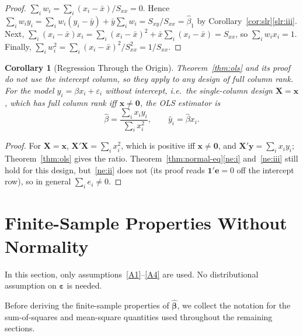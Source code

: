 \documentclass[14pt]{extarticle}
\theoremstyle{plain}
\newtheorem{corollary}[theorem]{Corollary}
\theoremstyle{definition}
\theoremstyle{remark}
\newcommand{\bX}{\mathbf{X}}
\newcommand{\by}{\mathbf{y}}
\newcommand{\bx}{\mathbf{x}}
\def\bb{\boldsymbol{\beta}}
\newcommand{\be}{\boldsymbol{\varepsilon}}
\newcommand{\bone}{\mathbf{1}}
\newcommand{\bzero}{\mathbf{0}}
\begin{document}
\begin{proof}
$\sum_i w_i = \sum_i (x_i - \bar x)/S_{xx} = 0$. Hence $\sum_i w_iy_i = \sum_i w_i(y_i - \bar y) + \bar y\sum_i w_i = S_{xy}/S_{xx} = \hat\beta_1$ by Corollary~\ref{cor:slr}\ref{slr:iii}. Next, $\sum_i (x_i - \bar x)x_i = \sum_i (x_i - \bar x)^2 + \bar x\sum_i(x_i - \bar x) = S_{xx}$, so $\sum_i w_ix_i = 1$. Finally, $\sum_i w_i^2 = \sum_i (x_i - \bar x)^2/S_{xx}^2 = 1/S_{xx}$.
\end{proof}

\begin{corollary}[Regression Through the Origin]\label{cor:origin}
Theorem~\ref{thm:ols} and its proof do not use the intercept column, so they apply to any design of full column rank. For the model $y_i = \beta x_i + \varepsilon_i$ without intercept, i.e.\ the single-column design $\bX = \bx$, which has full column rank iff $\bx \neq \bzero$, the OLS estimator is
\[
\hat\beta = \frac{\sum_i x_iy_i}{\sum_i x_i^2}, \qquad \hat y_i = \hat\beta x_i.
\]
\end{corollary}

\begin{proof}
For $\bX = \bx$, $\bX'\bX = \sum_i x_i^2$, which is positive iff $\bx \neq \bzero$, and $\bX'\by = \sum_i x_iy_i$; Theorem~\ref{thm:ols} gives the ratio. Theorem~\ref{thm:normal-eq}\ref{ne:i} and~\ref{ne:iii} still hold for this design, but~\ref{ne:ii} does not (its proof reads $\bone'\mathbf{e} = 0$ off the intercept row), so in general $\sum_i e_i \neq 0$.
\end{proof}

\section{Finite-Sample Properties Without Normality}\label{sec:finite}

In this section, only assumptions~\ref{A1}--\ref{A4} are used. No distributional assumption on $\be$ is needed.

Before deriving the finite-sample properties of $\hat{\bb}$, we collect the notation for the sum-of-squares and mean-square quantities used throughout the remaining sections.
\end{document}
